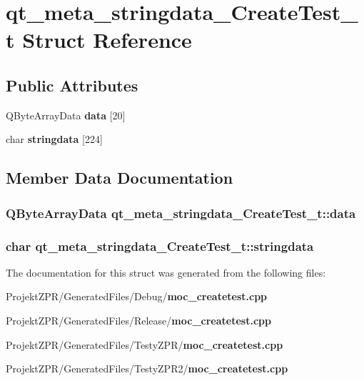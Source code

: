 \section{qt\-\_\-meta\-\_\-stringdata\-\_\-\-Create\-Test\-\_\-t Struct Reference}
\label{structqt__meta__stringdata___create_test__t}
\subsection*{Public Attributes}
\begin{DoxyCompactItemize}
\item 
Q\-Byte\-Array\-Data {\bf data} [20]
\item 
char {\bf stringdata} [224]
\end{DoxyCompactItemize}


\subsection{Member Data Documentation}
\subsubsection[{data}]{\setlength{\rightskip}{0pt plus 5cm}Q\-Byte\-Array\-Data qt\-\_\-meta\-\_\-stringdata\-\_\-\-Create\-Test\-\_\-t\-::data}\label{structqt__meta__stringdata___create_test__t_a8f26e164cb2f52d822837d3f0549c30f}
\subsubsection[{stringdata}]{\setlength{\rightskip}{0pt plus 5cm}char qt\-\_\-meta\-\_\-stringdata\-\_\-\-Create\-Test\-\_\-t\-::stringdata}\label{structqt__meta__stringdata___create_test__t_ae14c85848e292409260ba5e36cf19682}


The documentation for this struct was generated from the following files\-:\begin{DoxyCompactItemize}
\item 
Projekt\-Z\-P\-R/\-Generated\-Files/\-Debug/{\bf moc\-\_\-createtest.\-cpp}\item 
Projekt\-Z\-P\-R/\-Generated\-Files/\-Release/{\bf moc\-\_\-createtest.\-cpp}\item 
Projekt\-Z\-P\-R/\-Generated\-Files/\-Testy\-Z\-P\-R/{\bf moc\-\_\-createtest.\-cpp}\item 
Projekt\-Z\-P\-R/\-Generated\-Files/\-Testy\-Z\-P\-R2/{\bf moc\-\_\-createtest.\-cpp}\end{DoxyCompactItemize}
